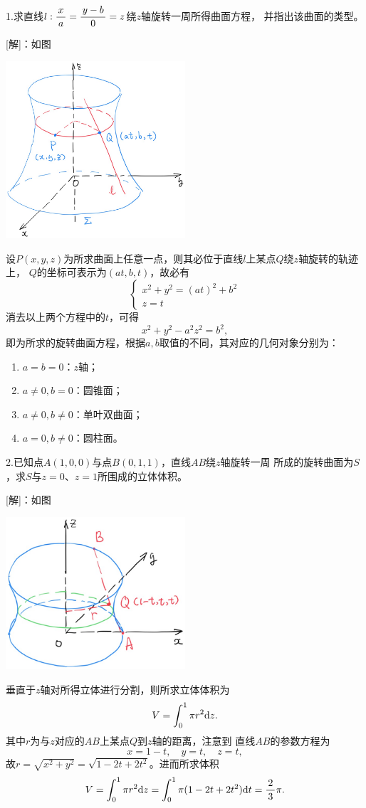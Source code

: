 1.求直线$l:\displaystyle\frac{\,{x}\,}{\,{a}\,}=\displaystyle\frac{\,{y-b}\,}{\,{0}\,}=z$绕$z$轴旋转一周所得曲面方程，
并指出该曲面的类型。

[解]：如图
\begin{center}
	\includegraphics[width=0.5\textwidth]{./images/ch8/abz.jpg}
\end{center}
设$P(x,y,z)$为所求曲面上任意一点，则其必位于直线$l$上某点$Q$绕$z$轴旋转的轨迹上，
$Q$的坐标可表示为$(at,b,t)$，故必有
$$\left\{\begin{array}{l}
	x^2+y^2=(at)^2+b^2\\
	z=t
\end{array}\right.$$
消去以上两个方程中的$t$，可得
$$x^2+y^2-a^2z^2=b^2,$$
即为所求的旋转曲面方程，根据$a,b$取值的不同，其对应的几何对象分别为：
\begin{enumerate}[(1)]
  \setlength{\itemindent}{1cm}
  \item $a=b=0$：$z$轴；
  \item $a\ne0,b=0$：圆锥面；
  \item $a\ne0,b\ne0$：单叶双曲面；
  \item $a=0,b\ne0$：圆柱面。
\end{enumerate}
\fin

\bs

2.已知点$A(1,0,0)$与点$B(0,1,1)$，直线$AB$绕$z$轴旋转一周
所成的旋转曲面为$S$，求$S$与$z=0$、$z=1$所围成的立体体积。

[解]：如图
\begin{center}
	\includegraphics[width=0.5\textwidth]{./images/ch8/abzz.jpg}
\end{center}
垂直于$z$轴对所得立体进行分割，则所求立体体积为
$$V=\displaystyle\int_0^1\pi r^2\mathrm{d} z.$$
其中$r$为与$z$对应的$AB$上某点$Q$到$z$轴的距离，注意到
直线$AB$的参数方程为
$$x=1-t,\quad y=t,\quad z=t,$$
故$r=\sqrt{x^2+y^2}=\sqrt{1-2t+2t^2}$。进而所求体积
$$V=\displaystyle\int_0^1\pi r^2\mathrm{d} z
=\displaystyle\int_0^1\pi(1-2t+2t^2)\mathrm{d} t=\displaystyle\frac{\,{2}\,}{\,{3}\,}\pi.$$
\fin

